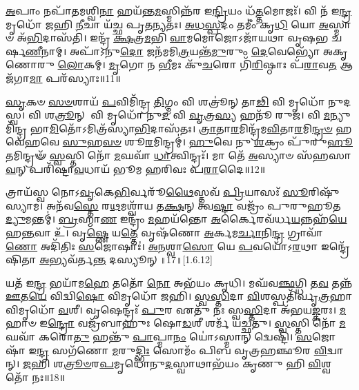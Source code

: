 \-\ul{𑌅}\-𑌪𑌾𑌂 𑌨𑌪𑌾᳴𑌤𑌮𑌶𑍍𑌵𑌿\-\ul{𑌨𑌾} 𑌹𑌯᳴𑌨𑍍𑌤\-\ul{𑌮}\-𑌸𑍍𑌮𑌿𑌨𑍍𑌨᳴𑌰 𑌇\-\ul{𑌨𑍍𑌦𑍍𑌰𑌿}\-𑌯𑌂 𑌧᳴\-\ul{𑌤𑍍𑌤}\-𑌮𑍋𑌜𑌃᳴। 𑌵𑌿 𑌨᳴ 𑌇\-\ul{𑌨𑍍𑌦𑍍𑌰} 𑌮𑍃𑌧𑍋᳴ 𑌜𑌹𑌿 \ul{𑌨𑍀}\-𑌚𑌾 𑌯᳴𑌚𑍍𑌛 𑌪𑍃𑌤\-\ul{𑌨𑍍𑌯}\-𑌤𑌃। \ul{𑌅}\-\-\ul{𑌧}\-\-\ul{𑌸𑍍𑌪}\-𑌦𑌂 𑌤𑌮𑍀𑌂॑ 𑌕𑍃\-\ul{𑌧𑌿} 𑌯𑍋 \ul{𑌅}\-𑌸𑍍𑌮𑌾𑍞 𑌅᳴\-\ul{𑌭𑌿}\-𑌦𑌾𑌸᳴𑌤𑌿। 𑌇𑌨𑍍𑌦𑍍𑌰᳴ \ul{𑌕𑍍𑌷}\-𑌤𑍍𑌰\-\ul{𑌮}\-𑌭𑌿 \ul{𑌵𑌾}\-𑌮𑌮𑍋𑌜𑍋𑌽𑌜𑌾᳴𑌯𑌥𑌾 𑌵𑍃𑌷𑌭 𑌚𑌰𑍍\mbox{}𑌷\-\ul{𑌣𑍀}\-𑌨𑌾𑌮𑍍। 𑌅𑌪𑌾᳴𑌽𑌨𑍁\-\ul{𑌦𑍋} 𑌜𑌨᳴𑌮𑌮𑌿\-\ul{𑌤𑍍𑌰}\-𑌯𑌨𑍍𑌤᳴\-\ul{𑌮𑍁}\-𑌰𑍁𑌂 \ul{𑌦𑍇}\-𑌵𑍇𑌭𑍍𑌯𑍋᳴ 𑌅𑌕𑍃𑌣𑍋𑌰𑍁 \ul{𑌲𑍋}\-𑌕𑌮𑍍। \ul{𑌮𑍃}\-𑌗𑍋 𑌨 \ul{𑌭𑍀}\-𑌮𑌃 𑌕𑍁᳴\-\ul{𑌚}\-𑌰𑍋 𑌗𑌿᳴\-\ul{𑌰𑌿}\-𑌷𑍍𑌠𑌾𑌃 𑌪᳴\-\ul{𑌰𑌾}\-𑌵\-\ul{𑌤} 𑌆 𑌜᳴𑌗𑌾\-\ul{𑌮𑌾} 𑌪𑌰᳴𑌸𑍍𑌯𑌾𑌃॥11॥
 
   \ul{𑌸𑍃}\-𑌕𑍞 \ul{𑌸}\-\-\ul{𑍞}\-𑌶𑌾𑌯᳴ \ul{𑌪}\-𑌵𑌿𑌮𑌿᳴𑌨𑍍𑌦𑍍𑌰 \ul{𑌤𑌿}\-𑌗𑍍𑌮𑌂 𑌵𑌿 𑌶𑌤𑍍𑌰𑍂॑𑌨𑍍 𑌤𑌾\-\ul{𑌢𑌿} 𑌵𑌿 𑌮𑍃𑌧𑍋᳴ 𑌨𑍁𑌦𑌸𑍍𑌵। 𑌵𑌿 𑌶\-\ul{𑌤𑍍𑌰𑍂}\-𑌨𑍍 𑌵𑌿 𑌮𑍃𑌧𑍋᳴ 𑌨𑍁\-\ul{𑌦} 𑌵𑌿 \ul{𑌵𑍃}\-𑌤𑍍𑌰\-\ul{𑌸𑍍𑌯} 𑌹𑌨𑍂᳴ 𑌰𑍁𑌜। 𑌵𑌿 \ul{𑌮}\-𑌨𑍍𑌯𑍁𑌮𑌿᳴𑌨𑍍𑌦𑍍𑌰 𑌭𑌾\-\ul{𑌮𑌿}\-𑌤𑍋᳴𑌽𑌮𑌿𑌤𑍍𑌰᳴𑌸𑍍𑌯𑌾\-\ul{𑌭𑌿}\-𑌦𑌾𑌸᳴𑌤𑌃। \ul{𑌤𑍍𑌰𑌾}\-𑌤𑌾\-\ul{𑌰}\-𑌮𑌿𑌨𑍍𑌦𑍍𑌰᳴𑌮\-\ul{𑌵𑌿}\-𑌤𑌾\-\ul{𑌰}\-𑌮𑌿\-\ul{𑌨𑍍𑌦𑍍𑌰}\-\-\ul{𑍞} 𑌹𑌵𑍇᳴𑌹𑌵𑍇 \ul{𑌸𑍁}\-𑌹\-\ul{𑌵}\-\-\ul{𑍞} 𑌶𑍂\-\ul{𑌰}\-𑌮𑌿𑌨𑍍𑌦𑍍𑌰𑌮𑍍॑। \ul{𑌹𑍁}\-𑌵𑍇 𑌨𑍁 \ul{𑌶}\-𑌕𑍍𑌰𑌂 𑌪𑍁᳴𑌰𑍁\-\ul{𑌹𑍂}\-𑌤𑌮𑌿𑌨𑍍𑌦𑍍𑌰𑍟᳴ \ul{𑌸𑍍𑌵}\-𑌸𑍍𑌤𑌿 𑌨𑍋᳴ \ul{𑌮}\-𑌘𑌵𑌾᳴ \ul{𑌧𑌾}\-𑌤𑍍𑌵𑌿𑌨𑍍𑌦𑍍𑌰𑌃᳴। 𑌮𑌾 𑌤𑍇᳴ \ul{𑌅}\-𑌸𑍍𑌯𑌾𑍞 𑌸᳴𑌹𑌸𑌾\-\ul{𑌵}\-𑌨𑍍 𑌪𑌰𑌿᳴𑌷𑍍𑌟𑌾\-\ul{𑌵}\-𑌧𑌾𑌯᳴ 𑌭𑍂𑌮 𑌹𑌰𑌿𑌵𑌃 𑌪\-\ul{𑌰𑌾}\-𑌦𑍈॥12॥ 
   
   𑌤𑍍𑌰𑌾𑌯᳴𑌸𑍍𑌵 𑌨𑍋𑌽\-\ul{𑌵𑍃}\-𑌕𑍇\-\ul{𑌭𑌿}\-𑌰𑍍𑌵𑌰𑍂᳴\-\ul{𑌥𑍈}\-𑌸𑍍𑌤𑌵᳴ \ul{𑌪𑍍𑌰𑌿}\-𑌯𑌾𑌸𑌃᳴ \ul{𑌸𑍂}\-𑌰𑌿𑌷𑍁᳴ 𑌸𑍍𑌯𑌾𑌮। 𑌅𑌨᳴𑌵\-\ul{𑌸𑍍𑌤𑍇} 𑌰\-\ul{𑌥}\-𑌮𑌶𑍍𑌵𑌾᳴𑌯 𑌤\-\ul{𑌕𑍍𑌷}\-𑌨𑍍 𑌤𑍍𑌵\-\ul{𑌷𑍍𑌟𑌾} 𑌵𑌜𑍍𑌰𑌂᳴ 𑌪𑍁𑌰𑍁𑌹𑍂𑌤 \ul{𑌦𑍍𑌯𑍁}\-𑌮𑌨𑍍𑌤𑌮𑍍॑। \ul{𑌬𑍍𑌰}\-𑌹𑍍𑌮𑌾\-\ul{𑌣} 𑌇𑌨𑍍𑌦𑍍𑌰𑌂᳴ \ul{𑌮}\-𑌹𑌯᳴𑌨𑍍𑌤𑍋 \ul{𑌅}\-𑌰𑍍𑌕𑍈𑌰𑌵᳴𑌰𑍍𑌧\-\ul{𑌯}\-𑌨𑍍𑌨𑌹᳴\-\ul{𑌯𑍇} 𑌹\-\ul{𑌨𑍍𑌤}\-𑌵𑌾 𑌉᳴। 𑌵𑍃\-\ul{𑌷𑍍𑌣𑍇} 𑌯\-\ul{𑌤𑍍𑌤𑍇} 𑌵𑍃𑌷᳴𑌣𑍋 \ul{𑌅}\-𑌰𑍍𑌕𑌮\-\ul{𑌰𑍍𑌚𑌾}\-𑌨𑌿\-\ul{𑌨𑍍𑌦𑍍𑌰} 𑌗𑍍𑌰𑌾𑌵𑌾᳴\-\ul{𑌣𑍋} 𑌅𑌦𑌿᳴𑌤𑌿𑌃 \ul{𑌸}\-𑌜𑍋𑌷𑌾𑌃॑। \ul{𑌅}\-\-\ul{𑌨}\-𑌶𑍍𑌵𑌾\-\ul{𑌸𑍋} 𑌯𑍇 \ul{𑌪}\-𑌵𑌯𑍋᳴𑌽\-\ul{𑌰}\-𑌥𑌾 𑌇𑌨𑍍𑌦𑍍𑌰𑍇᳴𑌷𑌿𑌤𑌾 \ul{𑌅}\-𑌭𑍍𑌯𑌵᳴𑌰𑍍𑌤\-\ul{𑌨𑍍𑌤} 𑌦𑌸𑍍𑌯𑍂𑌨𑍍॥17॥[1.6.12]


𑌯𑌤᳴ 𑌇\-\ul{𑌨𑍍𑌦𑍍𑌰} 𑌭𑌯𑌾᳴𑌮\-\ul{𑌹𑍇} 𑌤𑌤𑍋᳴ \ul{𑌨𑍋} 𑌅𑌭᳴𑌯𑌂 𑌕𑍃𑌧𑌿।
𑌮𑌘᳴𑌵\-\ul{𑌞𑍍𑌛}\-𑌗𑍍𑌧𑌿 𑌤\-\ul{𑌵} 𑌤𑌨𑍍𑌨᳴ \ul{𑌊}\-𑌤\-\ul{𑌯𑍇} 𑌵𑌿𑌦𑍍𑌵𑌿\-\ul{𑌷𑍋} 𑌵𑌿𑌮𑍃𑌧𑍋᳴ 𑌜𑌹𑌿।
\-\ul{𑌸𑍍𑌵}\-\-\ul{𑌸𑍍𑌤𑌿}\-𑌦𑌾 \ul{𑌵𑌿}\-𑌶𑌸𑍍𑌪𑌤𑌿᳴𑌰𑍍𑌵𑍃\-\ul{𑌤𑍍𑌰}\-𑌹𑌾 𑌵𑌿𑌮𑍃𑌧𑍋᳴ \ul{𑌵}\-𑌶𑍀।
𑌵𑍃𑌷𑍇𑌨𑍍𑌦𑍍𑌰𑌃᳴ \ul{𑌪𑍁}\-𑌰 𑌏𑌤𑍁᳴ 𑌨𑌃 𑌸𑍍𑌵\-\ul{𑌸𑍍𑌤𑌿}\-𑌦𑌾 𑌅᳴𑌭𑌯\-\ul{𑌙𑍍𑌕}\-𑌰𑌃।
\-\ul{𑌮}\-𑌹𑌾𑍞 𑌇\-\ul{𑌨𑍍𑌦𑍍𑌰𑍋} 𑌵𑌜𑍍𑌰᳴𑌬𑌾𑌹𑍁𑌃 𑌷𑍋\-\ul{𑌡}\-𑌶𑍀 𑌶𑌰𑍍𑌮᳴ 𑌯𑌚𑍍𑌛𑌤𑍁।
\-\ul{𑌸𑍍𑌵}\-𑌸𑍍𑌤𑌿 𑌨𑍋᳴ \ul{𑌮}\-𑌘𑌵𑌾᳴ 𑌕𑌰𑍋\-\ul{𑌤𑍁} 𑌹𑌨𑍍𑌤𑍁᳴ \ul{𑌪𑌾}\-𑌪𑍍𑌮𑌾\-\ul{𑌨𑌂} 𑌯𑍋॑𑌽𑌸𑍍𑌮𑌾𑌨𑍍‌ 𑌦𑍍𑌵𑍇𑌷𑍍𑌟𑌿᳴।
\-\ul{𑌸}\-𑌜𑍋𑌷𑌾᳴ 𑌇\-\ul{𑌨𑍍𑌦𑍍𑌰} 𑌸𑌗᳴𑌣𑍋 \ul{𑌮}\-𑌰𑍁\-\ul{𑌦𑍍𑌭𑌿𑌃} 𑌸𑍋𑌮𑌂᳴ 𑌪𑌿𑌬 𑌵𑍃𑌤𑍍𑌰𑌹𑌞𑍍𑌛𑍂𑌰 \ul{𑌵𑌿}\-𑌦𑍍𑌵𑌾𑌨𑍍‌।
\-\ul{𑌜}\-𑌹𑌿 𑌶\-\ul{𑌤𑍍𑌰𑍂}\-\-\ul{𑍞}\-𑌰\-\ul{𑌪}\-𑌮𑍃𑌧𑍋᳴𑌨𑍁\-\ul{𑌦}\-𑌸𑍍𑌵𑌾𑌥𑌾𑌭᳴𑌯𑌂 𑌕𑍃𑌣𑍁 𑌹𑌿 \ul{𑌵𑌿}\-𑌶𑍍𑌵𑌤𑍋᳴ 𑌨𑌃॥18॥


